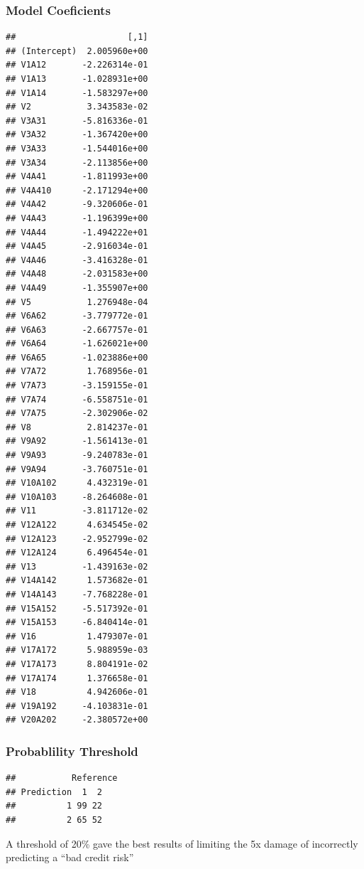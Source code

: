 \documentclass[]{article}
\newenvironment{Shaded}{\begin{snugshade}}{\end{snugshade}}
\newcommand{\KeywordTok}[1]{\textcolor[rgb]{0.13,0.29,0.53}{\textbf{#1}}}
\newcommand{\DataTypeTok}[1]{\textcolor[rgb]{0.13,0.29,0.53}{#1}}
\newcommand{\StringTok}[1]{\textcolor[rgb]{0.31,0.60,0.02}{#1}}
\newcommand{\OperatorTok}[1]{\textcolor[rgb]{0.81,0.36,0.00}{\textbf{#1}}}
\newcommand{\NormalTok}[1]{#1}
\begin{document}
\subsubsection{Model Coeficients}\label{model-coeficients}

\begin{Shaded}
\end{Shaded}

\begin{verbatim}
##                      [,1]
## (Intercept)  2.005960e+00
## V1A12       -2.226314e-01
## V1A13       -1.028931e+00
## V1A14       -1.583297e+00
## V2           3.343583e-02
## V3A31       -5.816336e-01
## V3A32       -1.367420e+00
## V3A33       -1.544016e+00
## V3A34       -2.113856e+00
## V4A41       -1.811993e+00
## V4A410      -2.171294e+00
## V4A42       -9.320606e-01
## V4A43       -1.196399e+00
## V4A44       -1.494222e+01
## V4A45       -2.916034e-01
## V4A46       -3.416328e-01
## V4A48       -2.031583e+00
## V4A49       -1.355907e+00
## V5           1.276948e-04
## V6A62       -3.779772e-01
## V6A63       -2.667757e-01
## V6A64       -1.626021e+00
## V6A65       -1.023886e+00
## V7A72        1.768956e-01
## V7A73       -3.159155e-01
## V7A74       -6.558751e-01
## V7A75       -2.302906e-02
## V8           2.814237e-01
## V9A92       -1.561413e-01
## V9A93       -9.240783e-01
## V9A94       -3.760751e-01
## V10A102      4.432319e-01
## V10A103     -8.264608e-01
## V11         -3.811712e-02
## V12A122      4.634545e-02
## V12A123     -2.952799e-02
## V12A124      6.496454e-01
## V13         -1.439163e-02
## V14A142      1.573682e-01
## V14A143     -7.768228e-01
## V15A152     -5.517392e-01
## V15A153     -6.840414e-01
## V16          1.479307e-01
## V17A172      5.988959e-03
## V17A173      8.804191e-02
## V17A174      1.376658e-01
## V18          4.942606e-01
## V19A192     -4.103831e-01
## V20A202     -2.380572e+00
\end{verbatim}

\subsubsection{Probablility Threshold}\label{probablility-threshold}

\begin{Shaded}
\end{Shaded}

\begin{verbatim}
##           Reference
## Prediction  1  2
##          1 99 22
##          2 65 52
\end{verbatim}

A threshold of 20\% gave the best results of limiting the 5x damage of
incorrectly predicting a ``bad credit risk''
\end{document}

